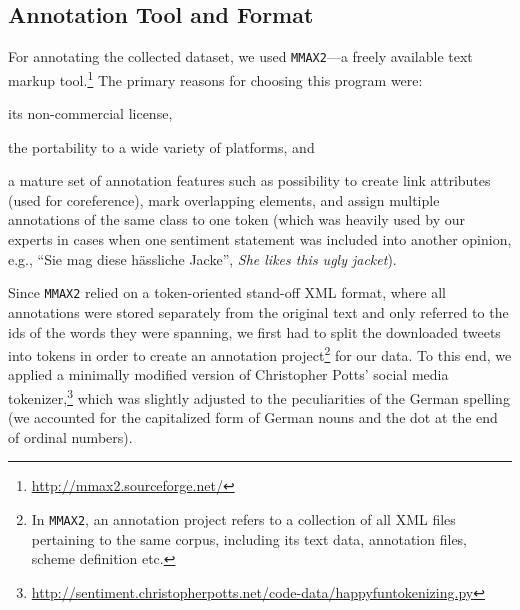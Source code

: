 \subsection{Annotation Tool and Format}\label{subsec:snt:tformat}

For annotating the collected dataset, we used \texttt{MMAX2}---a
freely available text markup
tool.\footnote{\url{http://mmax2.sourceforge.net/}} The primary
reasons for choosing this program were:
\begin{inparaenum}
 \item its non-commercial license,
 \item the portability to a wide variety of platforms, and
 \item a mature set of annotation features such as possibility to
   create link attributes (used for coreference), mark overlapping
   elements, and assign multiple annotations of the same class to one
   token (which was heavily used by our experts in cases when one
   sentiment statement was included into another opinion, e.g., ``Sie
   mag diese h\"assliche Jacke'', \emph{She likes this ugly jacket}).
\end{inparaenum}

Since \texttt{MMAX2} relied on a token-oriented stand-off XML format,
where all annotations were stored separately from the original text
and only referred to the ids of the words they were spanning, we first
had to split the downloaded tweets into tokens in order to create an
annotation project\footnote{In \texttt{MMAX2}, an annotation project
  refers to a collection of all XML files pertaining to the same
  corpus, including its text data, annotation files, scheme definition
  etc.} for our data.  To this end, we applied a minimally modified
version of Christopher Potts' social media
tokenizer,\footnote{\url{http://sentiment.christopherpotts.net/code-data/happyfuntokenizing.py}}
which was slightly adjusted to the peculiarities of the German
spelling (we accounted for the capitalized form of German nouns and
the dot at the end of ordinal numbers).

